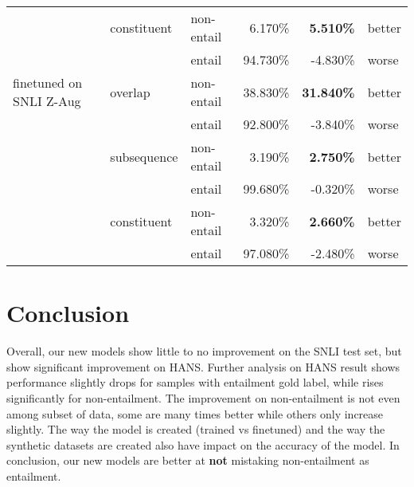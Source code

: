 \documentclass{article}
\begin{document}
\begin{table}[]
\begin{tabular}{lllrrl}
                                          & constituent         & non-entail          & 6.170\%                                & \textbf{5.510\%}                                & better        \\
                                          &                     & entail              & 94.730\%                               & -4.830\%                                        & worse         \\
        finetuned on SNLI Z-Aug          & overlap             & non-entail          & 38.830\%                               & \textbf{31.840\%}                               & better        \\
                                          &                     & entail              & 92.800\%                               & -3.840\%                                        & worse         \\
                                          & subsequence         & non-entail          & 3.190\%                                & \textbf{2.750\%}                                & better        \\
                                          &                     & entail              & 99.680\%                               & -0.320\%                                        & worse         \\
                                          & constituent         & non-entail          & 3.320\%                                & \textbf{2.660\%}                                & better        \\
                                          &                     & entail              & 97.080\%                               & -2.480\%                                        & worse        \\ \hline
    \end{tabular}
\end{table}


\section{Conclusion}

Overall, our new models show little to no improvement on the SNLI test set, but show significant improvement on HANS. Further analysis on HANS result shows performance slightly drops for samples with entailment gold label, while rises significantly for non-entailment.
The improvement on non-entailment is not even among subset of data, some are many times better while others only increase slightly.
The way the model is created (trained vs finetuned) and the way the synthetic datasets are created also have impact on the accuracy of the model.
In conclusion, our new models are better at \textbf{not} mistaking non-entailment as entailment.
\end{document}
